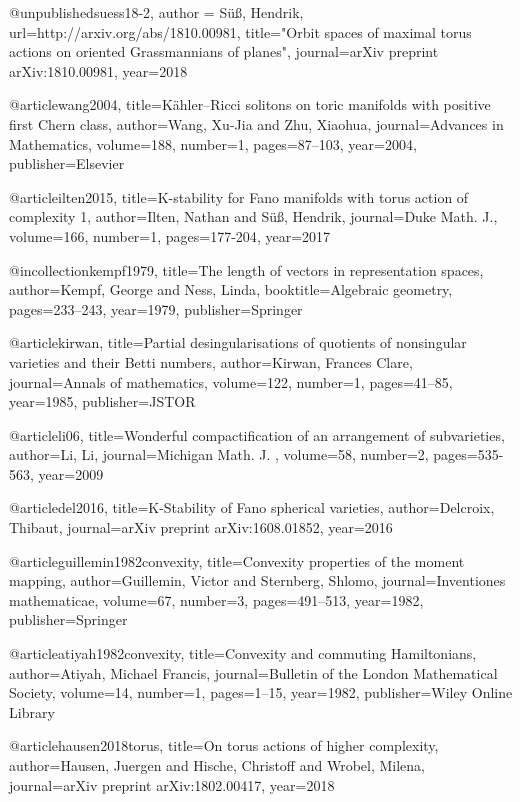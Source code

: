 @unpublished{suess18-2,
   author = {S{\"u}{\ss}, Hendrik},
   url={http://arxiv.org/abs/1810.00981},
   title="{Orbit spaces of maximal torus actions on oriented {G}rassmannians of planes}",
   journal={arXiv preprint arXiv:1810.00981},
   year={2018}
}

@article{wang2004,
  title={{K}{\"a}hler--{R}icci solitons on toric manifolds with positive first {C}hern class},
  author={Wang, Xu-Jia and Zhu, Xiaohua},
  journal={Advances in Mathematics},
  volume={188},
  number={1},
  pages={87--103},
  year={2004},
  publisher={Elsevier}
}

@article{ilten2015,
  title={K-stability for {F}ano manifolds with torus action of complexity 1},
  author={Ilten, Nathan and S{\"u}{\ss}, Hendrik},
  journal={Duke Math. J.},
  volume={166},
  number={1},
  pages={177-204},
  year={2017}
}

@incollection{kempf1979,
  title={The length of vectors in representation spaces},
  author={Kempf, George and Ness, Linda},
  booktitle={Algebraic geometry},
  pages={233--243},
  year={1979},
  publisher={Springer}
}

@article{kirwan,
  title={Partial desingularisations of quotients of nonsingular varieties and their {B}etti numbers},
  author={Kirwan, Frances Clare},
  journal={Annals of mathematics},
  volume={122},
  number={1},
  pages={41--85},
  year={1985},
  publisher={JSTOR}
}

@article{li06,
  title={Wonderful compactification of an arrangement of subvarieties},
  author={Li, Li},
  journal={Michigan Math. J. },
  volume={58},
  number={2},
  pages={535-563},
  year={2009}
}

@article{del2016,
  title={K-Stability of {F}ano spherical varieties},
  author={Delcroix, Thibaut},
  journal={arXiv preprint arXiv:1608.01852},
  year={2016}
}

@article{guillemin1982convexity,
  title={Convexity properties of the moment mapping},
  author={Guillemin, Victor and Sternberg, Shlomo},
  journal={Inventiones mathematicae},
  volume={67},
  number={3},
  pages={491--513},
  year={1982},
  publisher={Springer}
}

@article{atiyah1982convexity,
  title={Convexity and commuting {H}amiltonians},
  author={Atiyah, Michael Francis},
  journal={Bulletin of the London Mathematical Society},
  volume={14},
  number={1},
  pages={1--15},
  year={1982},
  publisher={Wiley Online Library}
}

@article{hausen2018torus,
  title={On torus actions of higher complexity},
  author={Hausen, Juergen and Hische, Christoff and Wrobel, Milena},
  journal={arXiv preprint arXiv:1802.00417},
  year={2018}
}

